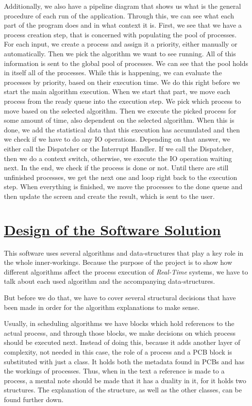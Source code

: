 \documentclass{article}
\newcommand{\code}[1]{\codeinline{\texttt{#1}}}
\begin{document}
Additionally, we also have a pipeline diagram that shows us what is the general procedure of each run of the application. Through this, we can see what each part of the program does and in what context it is. First, we see that we have a process creation step, that is concerned with populating the pool of processes. For each input, we create a process and assign it a priority, either manually or automatically. Then we pick the algorithm we want to see running. All of this information is sent to the global pool of processes. We can see that the pool holds in itself all of the processes. While this is happening, we can evaluate the processes by priority, based on their execution time. We do this right before we start the main algorithm execution. When we start that part, we move each process from the ready queue into the execution step. We pick which process to move based on the selected algorithm. Then we execute the picked process for some amount of time, also dependent on the selected algorithm. When this is done, we add the statistical data that this execution has accumulated and then we check if we have to do any IO operations. Depending on that answer, we either call the Dispatcher or the Interrupt Handler. If we call the Dispatcher, then we do a context switch, otherwise, we execute the IO operation waiting next. In the end, we check if the process is done or not. Until there are still unfinished processes, we get the next one and loop right back to the execution step. When everything is finished, we move the processes to the done queue and then update the screen and create the result, which is sent to the user.

\section{\underline{Design of the Software Solution}}

This software uses several algorithms and data-structures that play a key role in the whole inner-workings. Because the purpose of the project is to show how different algorithms affect the process execution of \textit{Real-Time} systems, we have to talk about each used algorithm and the accompanying data-structures.

But before we do that, we have to cover several structural decisions that have been made in order for the algorithm explanations to make sense.

Usually, in scheduling algorithms we have \code{PCB} blocks which hold references to the actual process, and through those blocks, we make decisions on which process should be executed next. Instead of doing this, because it adds another layer of complexity, not needed in this case, the role of a process and a PCB block is substituted with just a \code{process} class. It holds both the metadata found in PCBs and has the workings of processes. Thus, when in the text a reference is made to a process, a mental note should be made that it has a duality in it, for it holds two structures. The explanation of the \code{process} structure, as well as the other classes, can be found further down.
\end{document}
